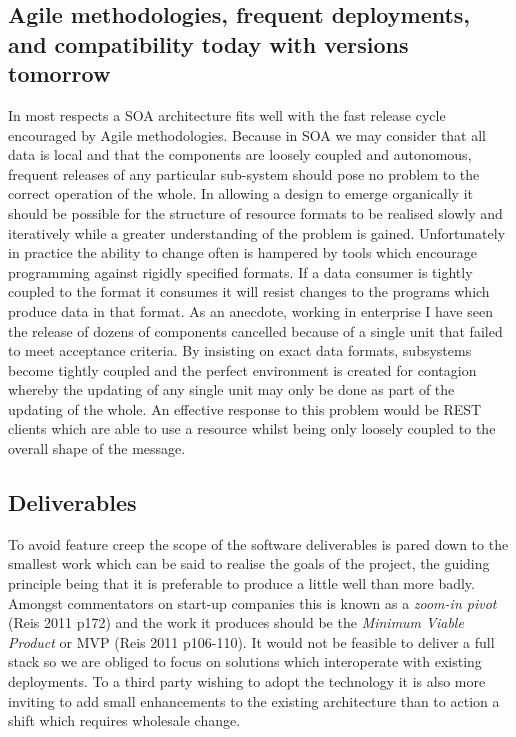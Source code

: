 \documentclass[12pt, ]{article}
\begin{document}
\subsection{Agile methodologies, frequent deployments, and compatibility
today with versions
tomorrow}\label{agile-methodologies-frequent-deployments-and-compatibility-today-with-versions-tomorrow}

In most respects a SOA architecture fits well with the fast release
cycle encouraged by Agile methodologies. Because in SOA we may consider
that all data is local and that the components are loosely coupled and
autonomous, frequent releases of any particular sub-system should pose
no problem to the correct operation of the whole. In allowing a design
to emerge organically it should be possible for the structure of
resource formats to be realised slowly and iteratively while a greater
understanding of the problem is gained. Unfortunately in practice the
ability to change often is hampered by tools which encourage programming
against rigidly specified formats. If a data consumer is tightly coupled
to the format it consumes it will resist changes to the programs which
produce data in that format. As an anecdote, working in enterprise I
have seen the release of dozens of components cancelled because of a
single unit that failed to meet acceptance criteria. By insisting on
exact data formats, subsystems become tightly coupled and the perfect
environment is created for contagion whereby the updating of any single
unit may only be done as part of the updating of the whole. An effective
response to this problem would be REST clients which are able to use a
resource whilst being only loosely coupled to the overall shape of the
message.

\subsection{Deliverables}\label{deliverables}

To avoid feature creep the scope of the software deliverables is pared
down to the smallest work which can be said to realise the goals of the
project, the guiding principle being that it is preferable to produce a
little well than more badly. Amongst commentators on start-up companies
this is known as a \emph{zoom-in pivot} (Reis 2011 p172) and the work it
produces should be the \emph{Minimum Viable Product} or MVP (Reis 2011
p106-110). It would not be feasible to deliver a full stack so we are
obliged to focus on solutions which interoperate with existing
deployments. To a third party wishing to adopt the technology it is also
more inviting to add small enhancements to the existing architecture
than to action a shift which requires wholesale change.
\end{document}
